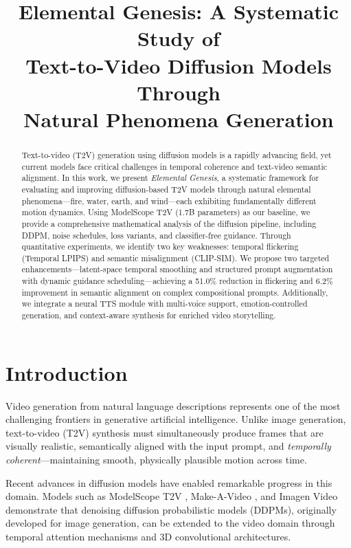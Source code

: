 \documentclass[conference]{IEEEtran}
\title{Elemental Genesis: A Systematic Study of\\Text-to-Video Diffusion Models Through\\Natural Phenomena Generation}
\author{
\IEEEauthorblockN{Walid Tamer (22100805), Adham Zewil (22101120),\\Mohamed Ibrahim (22101042), Shahd Farid (23102240)}
}
\begin{document}
\maketitle

\begin{abstract}
Text-to-video (T2V) generation using diffusion models is a rapidly advancing field, yet current models face critical challenges in temporal coherence and text-video semantic alignment. In this work, we present \textit{Elemental Genesis}, a systematic framework for evaluating and improving diffusion-based T2V models through natural elemental phenomena---fire, water, earth, and wind---each exhibiting fundamentally different motion dynamics. Using ModelScope T2V (1.7B parameters) as our baseline, we provide a comprehensive mathematical analysis of the diffusion pipeline, including DDPM, noise schedules, loss variants, and classifier-free guidance. Through quantitative experiments, we identify two key weaknesses: temporal flickering (Temporal LPIPS) and semantic misalignment (CLIP-SIM). We propose two targeted enhancements---latent-space temporal smoothing and structured prompt augmentation with dynamic guidance scheduling---achieving a 51.0\% reduction in flickering and 6.2\% improvement in semantic alignment on complex compositional prompts. Additionally, we integrate a neural TTS module with multi-voice support, emotion-controlled generation, and context-aware synthesis for enriched video storytelling.
\end{abstract}

\section{Introduction}

Video generation from natural language descriptions represents one of the most challenging frontiers in generative artificial intelligence. Unlike image generation, text-to-video (T2V) synthesis must simultaneously produce frames that are visually realistic, semantically aligned with the input prompt, and \textit{temporally coherent}---maintaining smooth, physically plausible motion across time.

Recent advances in diffusion models have enabled remarkable progress in this domain. Models such as ModelScope T2V \cite{wang2023modelscope}, Make-A-Video \cite{singer2022makeavideo}, and Imagen Video \cite{ho2022imagenvideo} demonstrate that denoising diffusion probabilistic models (DDPMs), originally developed for image generation, can be extended to the video domain through temporal attention mechanisms and 3D convolutional architectures.
\end{document}
